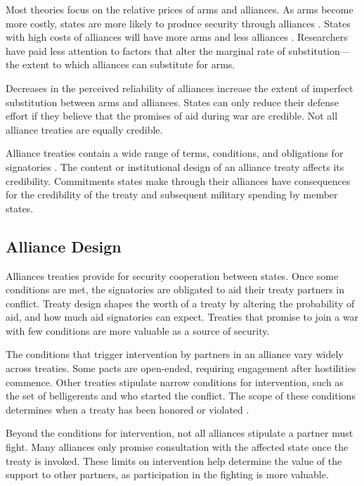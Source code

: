 \documentclass[12pt]{article}
\begin{document}
Most theories focus on the relative prices of arms and alliances. As arms become more costly, states are more likely to produce security through alliances \citep{AllenDigiuseppe2013, Kimball2010}. States with high costs of alliances will have more arms and less alliances \citep{Sorokin1994}. Researchers have paid less attention to factors that alter the marginal rate of substitution--- the extent to which alliances can substitute for arms. 

Decreases in the perceived reliability of alliances increase the extent of imperfect substitution between arms and alliances. States can only reduce their defense effort if they believe that the promises of aid during war are credible. Not all alliance treaties are equally credible. 

Alliance treaties contain a wide range of terms, conditions, and obligations for signatories \citep{Benson2011, Chibaetal2015}. The content or institutional design of an alliance treaty affects its credibility. Commitments states make through their alliances have consequences for the credibility of the treaty and subsequent military spending by member states. 

\subsection*{Alliance Design}

Alliances treaties provide for security cooperation between states. Once some conditions are met, the signatories are obligated to aid their treaty partners in conflict. Treaty design shapes the worth of a treaty by altering the probability of aid, and how much aid signatories can expect. Treaties that promise to join a war with few conditions are more valuable as a source of security. 

The conditions that trigger intervention by partners in an alliance vary widely across treaties. Some pacts are open-ended, requiring engagement after hostilities commence. Other treaties stipulate narrow conditions for intervention, such as the set of belligerents and who started the conflict. The scope of these conditions determines when a treaty has been honored or violated \citep{Leedsetal2000}. 

Beyond the conditions for intervention, not all alliances stipulate a partner must fight. Many alliances only promise consultation with the affected state once the treaty is invoked. These limits on intervention help determine the value of the support to other partners, as participation in the fighting is more valuable. 
\end{document}

